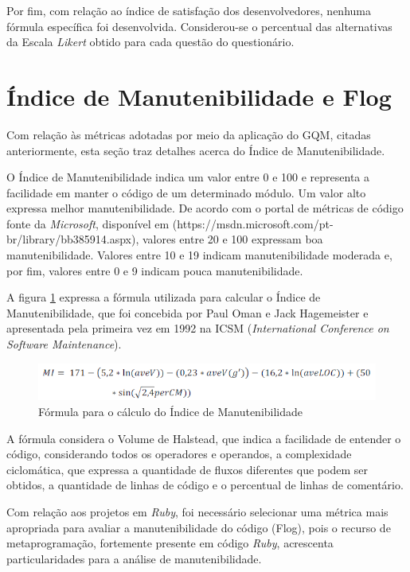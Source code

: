 Por fim, com relação ao índice de satisfação dos desenvolvedores, nenhuma fórmula específica foi desenvolvida. Considerou-se o percentual das alternativas da Escala \textit{Likert} obtido para cada questão do questionário.

\section{Índice de Manutenibilidade e Flog}

Com relação às métricas adotadas por meio da aplicação do GQM, citadas anteriormente, esta seção traz detalhes acerca do Índice de Manutenibilidade.

O Índice de Manutenibilidade indica um valor entre 0 e 100 e representa a facilidade em manter o código de um determinado módulo. Um valor alto expressa melhor manutenibilidade. De acordo com o portal de métricas de código fonte da \textit{Microsoft}, disponível em (https://msdn.microsoft.com/pt-br/library/bb385914.aspx), valores entre 20 e 100 expressam boa manutenibilidade. Valores entre 10 e 19 indicam manutenibilidade moderada e, por fim, valores entre 0 e 9 indicam pouca manutenibilidade.

A figura \ref{fig:formulaManutenibilidade} expressa a fórmula utilizada para calcular o Índice de Manutenibilidade, que foi concebida por Paul Oman e Jack Hagemeister e apresentada pela primeira vez em 1992 na ICSM (\textit{International Conference on Software Maintenance}).

\begin{figure}[h]
\includegraphics[width=\textwidth]{figuras/mi.png}
\caption{Fórmula para o cálculo do Índice de Manutenibilidade}
\label{fig:formulaManutenibilidade}
\end{figure}

A fórmula considera o Volume de Halstead, que indica a facilidade de entender o código, considerando todos os operadores e operandos, a complexidade ciclomática, que expressa a quantidade de fluxos diferentes que podem ser obtidos, a quantidade de linhas de código e o percentual de linhas de comentário.

Com relação aos projetos em \textit{Ruby}, foi necessário selecionar uma métrica mais apropriada para avaliar a manutenibilidade do código (Flog), pois o recurso de metaprogramação, fortemente presente em código \textit{Ruby}, acrescenta particularidades para a análise de manutenibilidade.

